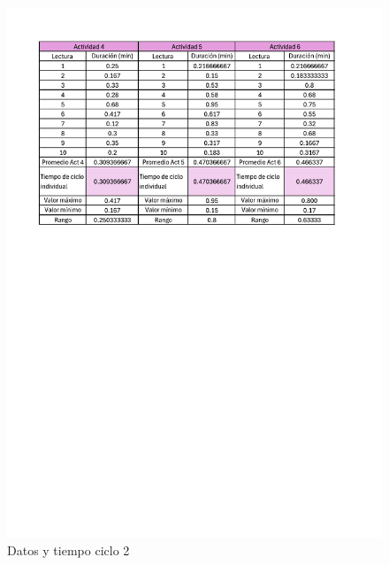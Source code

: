     \begin{figure}[H]
        \centering
        \includegraphics[trim = {15mm 160mm 20mm 
        0mm},clip,scale=0.4]{16/Img/muestreo2}
        \caption{Datos y tiempo ciclo 2}
        \label{fig:Datos y tiempo ciclo 2}
         \end{figure}
         
